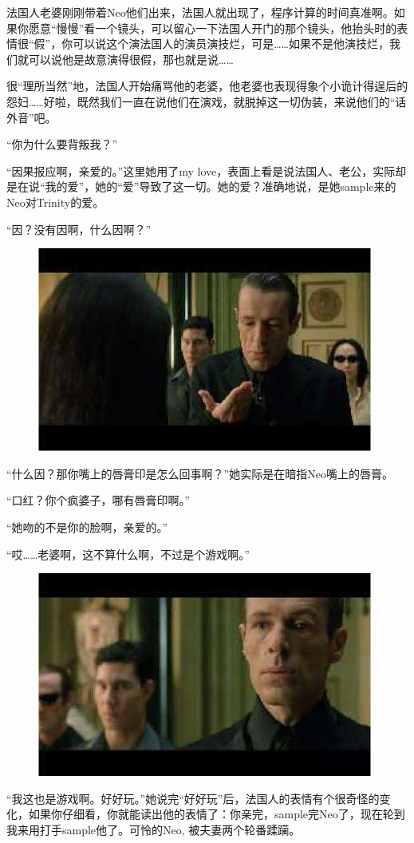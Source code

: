 \documentclass{ctexart}
\begin{document}
法国人老婆刚刚带着Neo他们出来，法国人就出现了，程序计算的时间真准啊。如果你愿意“慢慢”看一个镜头，可以留心一下法国人开门的那个镜头，他抬头时的表情很“假”，你可以说这个演法国人的演员演技烂，可是……如果不是他演技烂，我们就可以说他是故意演得很假，那也就是说……

很“理所当然”地，法国人开始痛骂他的老婆，他老婆也表现得象个小诡计得逞后的怨妇……好啦，既然我们一直在说他们在演戏，就脱掉这一切伪装，来说他们的“话外音”吧。

“你为什么要背叛我？”

“因果报应啊，亲爱的。”这里她用了my love，表面上看是说法国人、老公，实际却是在说“我的爱”，她的“爱”导致了这一切。她的爱？准确地说，是她sample来的Neo对Trinity的爱。

“因？没有因啊，什么因啊？”

\begin{figure}[htb]
\centering
\includegraphics[width=0.5\linewidth]{fig/read_reloaded-117}
\end{figure}

“什么因？那你嘴上的唇膏印是怎么回事啊？”她实际是在暗指Neo嘴上的唇膏。

“口红？你个疯婆子，哪有唇膏印啊。”

“她吻的不是你的脸啊，亲爱的。”

“哎……老婆啊，这不算什么啊，不过是个游戏啊。”

\begin{figure}[htb]
\centering
\includegraphics[width=0.5\linewidth]{fig/read_reloaded-118}
\end{figure}

“我这也是游戏啊。好好玩。”她说完“好好玩”后，法国人的表情有个很奇怪的变化，如果你仔细看，你就能读出他的表情了：你亲完，sample完Neo了，现在轮到我来用打手sample他了。可怜的Neo, 被夫妻两个轮番蹂躏。
\end{document}

